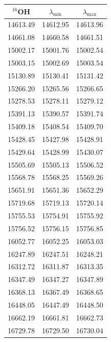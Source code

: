 \documentclass{article}
\begin{document}
  \begin{table}[h!]
    
    \begin{minipage}[t]{.4\linewidth}
    \begin{center}
      \vfill
        \begin{tabular}{ccc}
        \hline
        \hline
        $^{16}$OH & $\lambda_{\mathrm{min}}$ & $\lambda_{\mathrm{max}}$ \\
        \hline
        14613.49 & 14612.95 & 14613.96 \\
        14661.08 & 14660.58 & 14661.51 \\
        15002.17 & 15001.76 & 15002.54 \\
        15003.15 & 15002.69 & 15003.54 \\
        15130.89 & 15130.41 & 15131.42 \\
        15266.20 & 15265.56 & 15266.65 \\
        15278.53 & 15278.11 & 15279.12 \\
        15391.13 & 15390.57 & 15391.74 \\
        15409.18 & 15408.54 & 15409.70 \\
        15428.45 & 15427.98 & 15428.91 \\
        15429.64 & 15428.99 & 15430.07 \\
        15505.69 & 15505.13 & 15506.52 \\
        15568.78 & 15568.25 & 15569.26 \\
        15651.91 & 15651.36 & 15652.29 \\
        15719.68 & 15719.13 & 15720.14 \\
        15755.53 & 15754.91 & 15755.92 \\
        15756.52 & 15756.15 & 15756.85 \\
        16052.77 & 16052.25 & 16053.03 \\
        16247.89 & 16247.51 & 16248.21 \\
        16312.72 & 16311.87 & 16313.35 \\
        16347.49 & 16347.27 & 16347.89 \\
        16368.13 & 16367.49 & 16368.65 \\
        16448.05 & 16447.49 & 16448.50 \\
        16662.19 & 16661.81 & 16662.73 \\
        16729.78 & 16729.50 & 16730.04 \\

\end{tabular}
\end{center}
\end{minipage}
\end{table}
\end{document}
